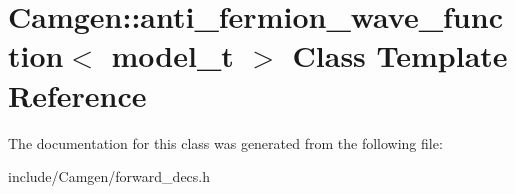 \hypertarget{a00010}{\section{Camgen\-:\-:anti\-\_\-fermion\-\_\-wave\-\_\-function$<$ model\-\_\-t $>$ Class Template Reference}
\label{a00010}
}


The documentation for this class was generated from the following file\-:\begin{DoxyCompactItemize}
\item 
include/\-Camgen/forward\-\_\-decs.\-h\end{DoxyCompactItemize}
